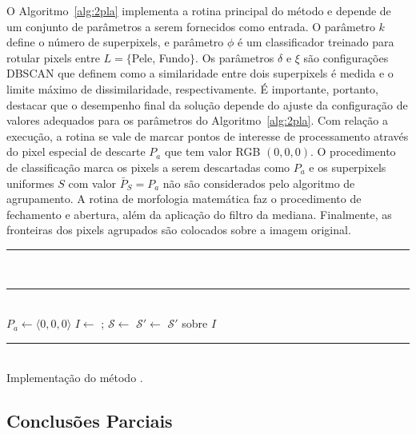 O Algoritmo~\ref{alg:2pla} implementa a rotina principal do método \system e depende de um conjunto de parâmetros a serem fornecidos como entrada.
O parâmetro $k$ define o número de superpixels, e parâmetro $\phi$ é um classificador treinado para rotular pixels entre $L = \{$Pele, Fundo$\}$.
Os parâmetros $\delta$ e $\xi$ são configurações DBSCAN que definem como a similaridade entre dois superpixels é medida e o limite máximo de dissimilaridade, respectivamente.
É importante, portanto, destacar que o desempenho final da solução depende do ajuste da configuração de valores adequados para os parâmetros do Algoritmo~\ref{alg:2pla}.
Com relação a execução, a rotina se vale de marcar pontos de interesse de processamento através do pixel especial de descarte $P_a$ que tem valor RGB $(0, 0, 0)$.
O procedimento de classificação marca os pixels a serem descartadas como $P_a$ e os superpixels uniformes $S$ com valor $\bar{P}_S = P_a$ não são considerados pelo algoritmo de agrupamento.
A rotina de morfologia matemática faz o procedimento de fechamento e abertura, além da aplicação do filtro da mediana.
Finalmente, as fronteiras dos pixels agrupados são colocados sobre a imagem original.

\begin{algorithm}[!htb]
\nonl \rule[0.5ex]{410px}{0.5pt}\\
\nonl \rule[0.5ex]{410px}{0.5pt}\\
$P_a \leftarrow \langle 0, 0, 0\rangle$\;
$I \leftarrow$ ;
$\mathcal{S} \leftarrow$ \;
$\mathcal{S'} \leftarrow$ \;
\Return $\mathcal{S'}$ sobre $I$\;
\nonl \rule[0.5ex]{410px}{0.5pt}\\
\caption{Implementação do método \system.}
\label{alg:2pla}
\end{algorithm}

\subsection{Conclusões Parciais}

